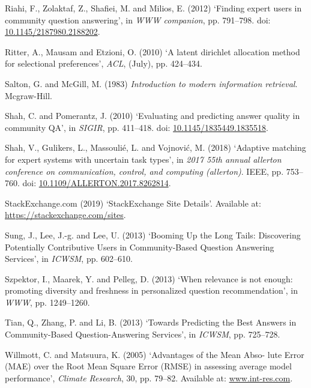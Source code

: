 \documentclass[11pt,preprint, authoryear]{article}
\begin{document}
\hypertarget{ref-Riahi2012}{}
Riahi, F., Zolaktaf, Z., Shafiei, M. and Milios, E. (2012) `Finding
expert users in community question answering', in \emph{WWW companion},
pp. 791--798. doi:
\href{https://doi.org/10.1145/2187980.2188202}{10.1145/2187980.2188202}.

\hypertarget{ref-Ritter2010}{}
Ritter, A., Mausam and Etzioni, O. (2010) `A latent dirichlet allocation
method for selectional preferences', \emph{ACL}, (July), pp. 424--434.

\hypertarget{ref-Salton1983}{}
Salton, G. and McGill, M. (1983) \emph{Introduction to modern
information retrieval}. Mcgraw-Hill.

\hypertarget{ref-Shah2010}{}
Shah, C. and Pomerantz, J. (2010) `Evaluating and predicting answer
quality in community QA', in \emph{SIGIR}, pp. 411--418. doi:
\href{https://doi.org/10.1145/1835449.1835518}{10.1145/1835449.1835518}.

\hypertarget{ref-Shah2018}{}
Shah, V., Gulikers, L., Massoulié, L. and Vojnović, M. (2018) `Adaptive
matching for expert systems with uncertain task types', in \emph{2017
55th annual allerton conference on communication, control, and computing
(allerton)}. IEEE, pp. 753--760. doi:
\href{https://doi.org/10.1109/ALLERTON.2017.8262814}{10.1109/ALLERTON.2017.8262814}.

\hypertarget{ref-StackExchange.com2019}{}
StackExchange.com (2019) `StackExchange Site Details'. Available at:
\url{https://stackexchange.com/sites}.

\hypertarget{ref-Sung2013}{}
Sung, J., Lee, J.-g. and Lee, U. (2013) `Booming Up the Long Tails:
Discovering Potentially Contributive Users in Community-Based Question
Answering Services', in \emph{ICWSM}, pp. 602--610.

\hypertarget{ref-Szpektor2013}{}
Szpektor, I., Maarek, Y. and Pelleg, D. (2013) `When relevance is not
enough: promoting diversity and freshness in personalized question
recommendation', in \emph{WWW}, pp. 1249--1260.

\hypertarget{ref-Tian2013}{}
Tian, Q., Zhang, P. and Li, B. (2013) `Towards Predicting the Best
Answers in Community-Based Question-Answering Services', in
\emph{ICWSM}, pp. 725--728.

\hypertarget{ref-Willmott2005}{}
Willmott, C. and Matsuura, K. (2005) `Advantages of the Mean Abso- lute
Error (MAE) over the Root Mean Square Error (RMSE) in assessing average
model performance', \emph{Climate Research}, 30, pp. 79--82. Available
at: \url{www.int-res.com}.
\end{document}
